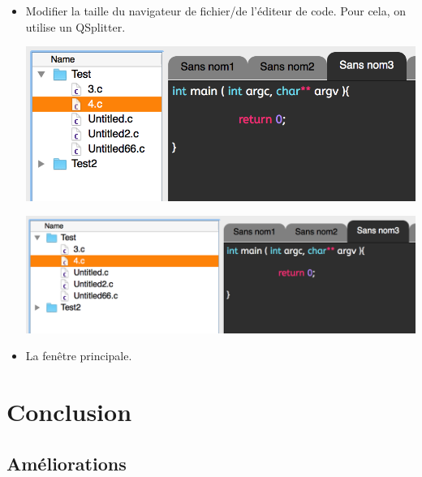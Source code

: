 \documentclass[a4paper,12pt]{article}
\begin{document}
\begin{itemize}
			\item Modifier la taille du navigateur de fichier/de l'éditeur de code. Pour cela, on utilise un QSplitter.\\
			
			\begin{center}
				\includegraphics[scale=0.6]{images/QSplitter_1}
				\vspace{0.6cm}
			\end{center}

			\begin{center}
				\includegraphics[scale=0.6]{images/QSplitter_2}
				\vspace{0.6cm}
			\end{center}
			
			\item La fenêtre principale.			
			
		\end{itemize}
	
	
\section{Conclusion}
	
	\subsection{Améliorations}
\end{document}
